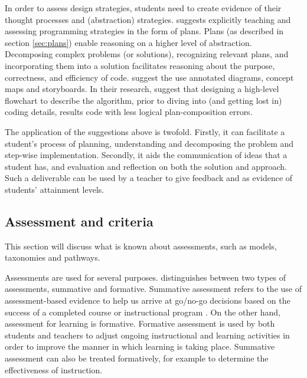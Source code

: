 In order to assess design strategies, students need to create evidence of their thought processes and (abstraction) strategies. \citeauthor{deRaadt2009teachingPlans} suggests explicitly teaching and assessing programming strategies in the form of plans. Plans (as described in section \ref{sec:plans}) enable reasoning on a higher level of abstraction. Decomposing complex problems (or solutions), recognizing relevant plans, and incorporating them into a solution facilitates reasoning about the purpose, correctness, and efficiency of code.  suggest the use annotated diagrams, concept maps and storyboards. In their research,  suggest that designing a high-level flowchart to describe the algorithm, prior to diving into (and getting lost in) coding details, results code with less logical plan-composition errors.

The application of the suggestions above is twofold. Firstly, it can facilitate a student's process of planning, understanding and decomposing the problem and step-wise implementation. Secondly, it aids the communication of ideas that a student has, and evaluation and reflection on both the solution and approach. Such a deliverable can be used by a teacher to give feedback and as evidence of students' attainment levels.








\subsection{Assessment and criteria}
This section will discuss what is known about assessments, such as models, taxonomies and pathways.


Assessments are used for several purposes.  distinguishes between two types of assessments, summative and formative. Summative assessment refers to the use of assessment-based evidence to help us arrive at go/no-go decisions based on the success of a completed course or instructional program \cite{popham2009assessment}. On the other hand, assessment for learning is formative. Formative assessment is used by both students and teachers to adjust ongoing instructional and learning activities in order to improve the manner in which learning is taking place. Summative assessment can also be treated formatively, for example to determine the effectiveness of instruction.


